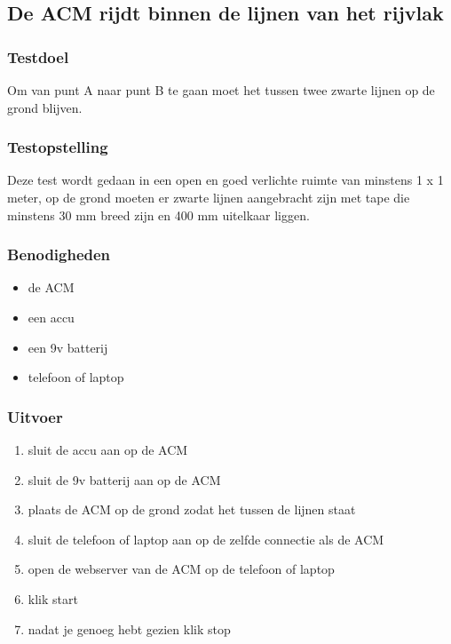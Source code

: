 \subsection{De ACM rijdt binnen de lijnen van het rijvlak}
\subsubsection{Testdoel}
\begin{flushleft}
    Om van punt A naar punt B te gaan moet het tussen twee zwarte lijnen op de grond blijven.
\end{flushleft}
\subsubsection{Testopstelling}
\begin{flushleft}
    Deze test wordt gedaan in een open en goed verlichte ruimte van minstens 1 x 1 meter, op de grond moeten er zwarte lijnen aangebracht zijn met tape die minstens 30 mm breed zijn en 400 mm uitelkaar liggen.
\end{flushleft}

\subsubsection{Benodigheden}

\begin{itemize}
    \item de ACM
    \item een accu
    \item een 9v batterij
    \item telefoon of laptop
\end{itemize}

\subsubsection{Uitvoer}

\begin{enumerate}
    \item sluit de accu aan op de ACM
    \item sluit de 9v batterij aan op de ACM
    \item plaats de ACM op de grond zodat het tussen de lijnen staat
    \item sluit de telefoon of laptop aan op de zelfde connectie als de ACM
    \item open de webserver van de ACM op de telefoon of laptop
    \item klik start
    \item nadat je genoeg hebt gezien klik stop
\end{enumerate}

